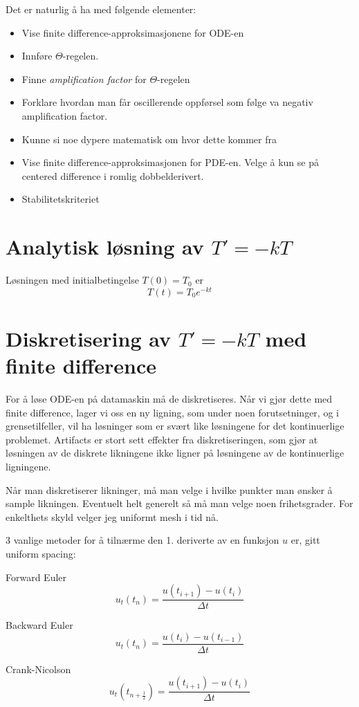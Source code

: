 \documentclass[a4paper, 10pt]{article}
\begin{document}
Det er naturlig å ha med følgende elementer:
\begin{itemize}
\item Vise finite difference-approksimasjonene for ODE-en
\item Innføre $\Theta$-regelen.
\item Finne \emph{amplification factor} for $\Theta$-regelen
\item Forklare hvordan man får oscillerende oppførsel som følge va negativ amplification factor.
\item Kunne si noe dypere matematisk om hvor dette kommer fra

\item Vise finite difference-approksimasjonen for PDE-en. Velge å kun se på centered difference i romlig dobbelderivert. 
\item Stabilitetskriteriet 
\end{itemize}

\section{Analytisk løsning av $T' = -kT$}
Løsningen med initialbetingelse $T(0) = T_0$ er 
\begin{equation}
	T(t) = T_0 e^{-kt}
\end{equation}


\section{Diskretisering av $T' = -kT$ med finite difference}
For å løse ODE-en på datamaskin må de diskretiseres. Når vi gjør dette med finite difference, lager vi oss en ny ligning, som under noen forutsetninger, og i grensetilfeller, vil ha løsninger som er svært like løsningene for det kontinuerlige problemet. Artifacts er stort sett effekter fra diskretiseringen, som gjør at løsningen av de diskrete likningene ikke ligner på løsningene av de kontinuerlige ligningene. 

Når man diskretiserer likninger, må man velge i hvilke punkter man ønsker å sample likningen. Eventuelt helt generelt så må man velge noen frihetsgrader. For enkelthets skyld velger jeg uniformt mesh i tid nå.

3 vanlige metoder for å tilnærme den 1. deriverte av en funksjon $u$ er, gitt uniform spacing: \\
\begin{center}
{Forward Euler}
\begin{equation}
	u_t(t_n) = \frac{u(t_{i+1})-u(t_i)}{\Delta t}
\end{equation}

{Backward Euler}
\begin{equation}
	u_t(t_n) = \frac{u(t_{i})-u(t_{i-1})}{\Delta t}
\end{equation}

{Crank-Nicolson}
\begin{equation}
	u_t(t_{n+\frac{1}{2}}) = \frac{u(t_{i+1})-u(t_i)}{\Delta t}
\end{equation}
\end{center}
\end{document}
